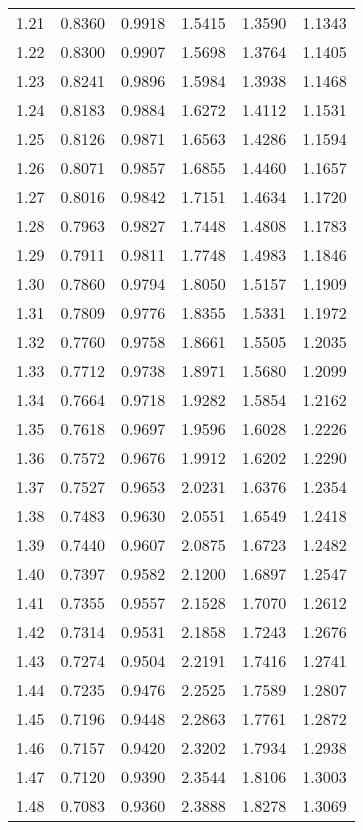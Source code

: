 \documentclass{article}
\begin{document}
\begin{longtable}{cccccc}
1.21 & 0.8360 & 0.9918 & 1.5415 & 1.3590 & 1.1343 \\
1.22 & 0.8300 & 0.9907 & 1.5698 & 1.3764 & 1.1405 \\
1.23 & 0.8241 & 0.9896 & 1.5984 & 1.3938 & 1.1468 \\
1.24 & 0.8183 & 0.9884 & 1.6272 & 1.4112 & 1.1531 \\
1.25 & 0.8126 & 0.9871 & 1.6563 & 1.4286 & 1.1594 \\
1.26 & 0.8071 & 0.9857 & 1.6855 & 1.4460 & 1.1657 \\
1.27 & 0.8016 & 0.9842 & 1.7151 & 1.4634 & 1.1720 \\
1.28 & 0.7963 & 0.9827 & 1.7448 & 1.4808 & 1.1783 \\
1.29 & 0.7911 & 0.9811 & 1.7748 & 1.4983 & 1.1846 \\
1.30 & 0.7860 & 0.9794 & 1.8050 & 1.5157 & 1.1909 \\
1.31 & 0.7809 & 0.9776 & 1.8355 & 1.5331 & 1.1972 \\
1.32 & 0.7760 & 0.9758 & 1.8661 & 1.5505 & 1.2035 \\
1.33 & 0.7712 & 0.9738 & 1.8971 & 1.5680 & 1.2099 \\
1.34 & 0.7664 & 0.9718 & 1.9282 & 1.5854 & 1.2162 \\
1.35 & 0.7618 & 0.9697 & 1.9596 & 1.6028 & 1.2226 \\
1.36 & 0.7572 & 0.9676 & 1.9912 & 1.6202 & 1.2290 \\
1.37 & 0.7527 & 0.9653 & 2.0231 & 1.6376 & 1.2354 \\
1.38 & 0.7483 & 0.9630 & 2.0551 & 1.6549 & 1.2418 \\
1.39 & 0.7440 & 0.9607 & 2.0875 & 1.6723 & 1.2482 \\
1.40 & 0.7397 & 0.9582 & 2.1200 & 1.6897 & 1.2547 \\
1.41 & 0.7355 & 0.9557 & 2.1528 & 1.7070 & 1.2612 \\
1.42 & 0.7314 & 0.9531 & 2.1858 & 1.7243 & 1.2676 \\
1.43 & 0.7274 & 0.9504 & 2.2191 & 1.7416 & 1.2741 \\
1.44 & 0.7235 & 0.9476 & 2.2525 & 1.7589 & 1.2807 \\
1.45 & 0.7196 & 0.9448 & 2.2863 & 1.7761 & 1.2872 \\
1.46 & 0.7157 & 0.9420 & 2.3202 & 1.7934 & 1.2938 \\
1.47 & 0.7120 & 0.9390 & 2.3544 & 1.8106 & 1.3003 \\
1.48 & 0.7083 & 0.9360 & 2.3888 & 1.8278 & 1.3069 \\

\end{longtable}
\end{document}
